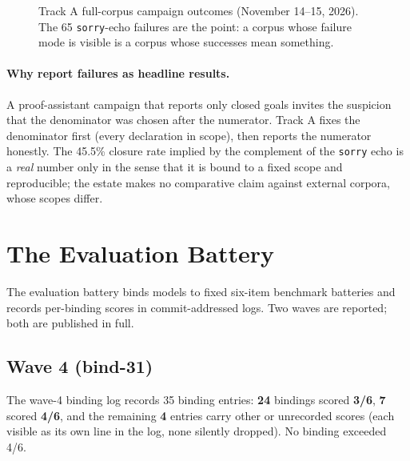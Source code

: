 ﻿\documentclass[11pt]{article}
\begin{document}
\begin{figure}[htbp]
\centering
{}
\caption{Track A full-corpus campaign outcomes (November 14--15, 2026). The 65 \texttt{sorry}-echo failures are the point: a corpus whose failure mode is visible is a corpus whose successes mean something.}
\label{fig:tracka}
\end{figure}

\paragraph{Why report failures as headline results.} A proof-assistant campaign that reports only closed goals invites the suspicion that the denominator was chosen after the numerator. Track A fixes the denominator first (every declaration in scope), then reports the numerator honestly. The 45.5\% closure rate implied by the complement of the \texttt{sorry} echo is a \emph{real} number only in the sense that it is bound to a fixed scope and reproducible; the estate makes no comparative claim against external corpora, whose scopes differ.

\section{The Evaluation Battery}
\label{sec:battery}

The evaluation battery binds models to fixed six-item benchmark batteries and records per-binding scores in commit-addressed logs. Two waves are reported; both are published in full.

\subsection{Wave 4 (bind-31)}
The wave-4 binding log records 35 binding entries: \textbf{24} bindings scored \textbf{3/6}, \textbf{7} scored \textbf{4/6}, and the remaining \textbf{4} entries carry other or unrecorded scores (each visible as its own line in the log, none silently dropped). No binding exceeded 4/6.
\end{document}
